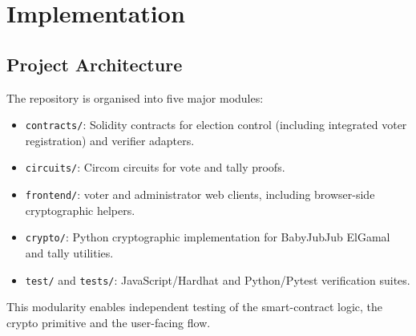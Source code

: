 \chapter{Implementation}
\begingroup
\justifying
\setlength{\parindent}{0pt}
\setlength{\parskip}{0.5\baselineskip}
\titlespacing{\chapter}{0pt}{0pt}{0pt}
\titlespacing{\section}{0pt}{0pt}{0pt}

\section{Project Architecture}

The repository is organised into five major modules:
\begin{itemize}
    \item \texttt{contracts/}: Solidity contracts for election control (including integrated voter registration) and verifier adapters.
    \item \texttt{circuits/}: Circom circuits for vote and tally proofs.
    \item \texttt{frontend/}: voter and administrator web clients, including browser-side cryptographic helpers.
    \item \texttt{crypto/}: Python cryptographic implementation for BabyJubJub ElGamal and tally utilities.
    \item \texttt{test/} and \texttt{tests/}: JavaScript/Hardhat and Python/Pytest verification suites.
\end{itemize}

This modularity enables independent testing of the smart-contract logic, the crypto primitive and the user-facing flow.

